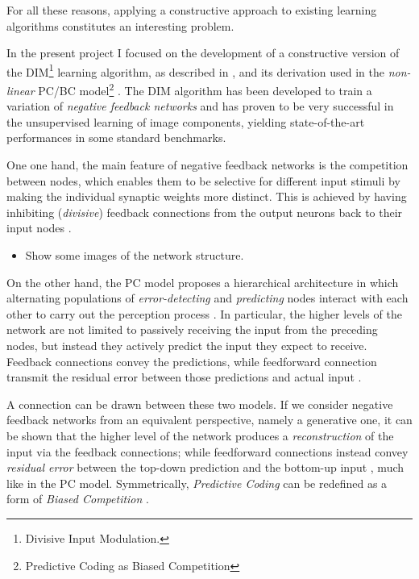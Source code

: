\documentclass[11pt,a4paper]{report}
\begin{document}
		For all these reasons, applying a constructive approach to existing learning algorithms constitutes an interesting problem.
		
		\newpage
		
		In the present project I focused on the development of a constructive version of the DIM\footnote{Divisive Input Modulation.} learning algorithm, as described in \cite{spratling2009unsupervised}, and its derivation \cite{spratling2012unsupervised} used in the \emph{non-linear} PC/BC model\footnote{Predictive Coding as Biased Competition} \cite{spratling2008predictive}. The DIM algorithm has been developed to train a variation of \emph{negative feedback networks} and has proven to be very successful in the unsupervised learning of image components, yielding state-of-the-art performances in some standard benchmarks.
		
		One one hand, the main feature of negative feedback networks is the competition between nodes, which enables them to be selective for different input stimuli by making the individual synaptic weights more distinct. This is achieved by having inhibiting (\emph{divisive}) feedback connections from the output neurons back to their input nodes \cite{spratling2009unsupervised}. 
		
		\begin{itemize}
			\item Show some images of the network structure.
		\end{itemize}
		
		On the other hand, the PC model proposes a hierarchical architecture in which alternating populations of \emph{error-detecting} and \emph{predicting} nodes interact with each other to carry out the perception process \cite{spratling2014predictive}. In particular, the higher levels of the network are not limited to passively receiving the input from the preceding nodes, but instead they actively predict the input they expect to receive. Feedback connections convey the predictions, while feedforward connection transmit the residual error between those predictions and actual input \cite{spratling2008predictive}.

		A connection can be drawn between these two models. If we consider negative feedback networks from an equivalent perspective, namely a generative one, it can be shown that the higher level of the network produces a \emph{reconstruction} of the input via the feedback connections; while feedforward connections instead convey \emph{residual error} between the top-down prediction and the bottom-up input \cite{spratling2009unsupervised}, much like in the PC model.
		Symmetrically, \emph{Predictive Coding} can be redefined as a form of \emph{Biased Competition} \cite{spratling2008predictive}.
		
\end{document}
